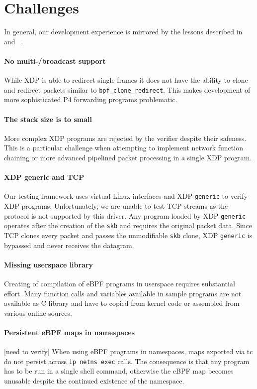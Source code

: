 \section{Challenges}\label{sec:conclusions}
In general, our development experience is mirrored by the lessons described 
in~\cite{minao-hspr18} and ~\cite{bertin-netdev17}.

\paragraph{No multi-/broadcast support}
While XDP is able to redirect single frames it does not have the ability to 
clone and redirect packets similar to \texttt{bpf\_clone\_redirect}. This makes 
development of more sophisticated P4 forwarding programs problematic.
\paragraph{The stack size is to small}
More complex XDP programs are rejected by the verifier despite their safeness. 
This is a particular challenge when attempting to implement network function 
chaining or more advanced pipelined packet processing in a single XDP program.

\paragraph{XDP generic and TCP}
Our testing framework uses virtual Linux interfaces and XDP \texttt{generic} 
to verify XDP programs. 
Unfortunately, we are unable to test TCP streams as the protocol is not 
supported by this driver.
Any program loaded by XDP \texttt{generic} operates after the creation of 
the \texttt{skb} and requires the original packet data. Since TCP clones every 
packet and passes the unmodifiable \texttt{skb} clone,  XDP \texttt{generic} is 
bypassed and never receives the datagram.
\paragraph{Missing userspace library}
Creating of compilation of eBPF programs in userspace requires substantial 
effort. Many function calls and variables available in sample programs are not 
available as C library and have to copied from kernel code or assembled from 
various online sources.

\paragraph{Persistent eBPF maps in namespaces}
[need to verify] When using eBPF programs in namespaces, maps exported via tc 
do not persist across \texttt{ip netns exec} calls. The consequence is that any 
program has to be run in a single shell command, otherwise the eBPF map becomes 
unusable despite the continued existence of the namespace.